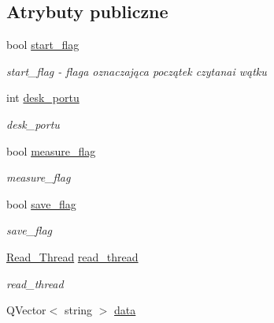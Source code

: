 \subsection*{Atrybuty publiczne}
\begin{DoxyCompactItemize}
\item 
bool \hyperlink{class_okno_a0cd2b4f8ec74806cc7d3256eff69385a}{start\+\_\+flag}\hypertarget{class_okno_a0cd2b4f8ec74806cc7d3256eff69385a}{}\label{class_okno_a0cd2b4f8ec74806cc7d3256eff69385a}

\begin{DoxyCompactList}\small\item\em start\+\_\+flag -\/ flaga oznaczająca początek czytanai wątku \end{DoxyCompactList}\item 
int \hyperlink{class_okno_ac9c31fbce4cb68413088827860277510}{desk\+\_\+portu}\hypertarget{class_okno_ac9c31fbce4cb68413088827860277510}{}\label{class_okno_ac9c31fbce4cb68413088827860277510}

\begin{DoxyCompactList}\small\item\em desk\+\_\+portu \end{DoxyCompactList}\item 
bool \hyperlink{class_okno_a5a94843afcfc67735c25e5a29f9cdc3c}{measure\+\_\+flag}\hypertarget{class_okno_a5a94843afcfc67735c25e5a29f9cdc3c}{}\label{class_okno_a5a94843afcfc67735c25e5a29f9cdc3c}

\begin{DoxyCompactList}\small\item\em measure\+\_\+flag \end{DoxyCompactList}\item 
bool \hyperlink{class_okno_afddfe7d21fc34910d75f92d8904acb23}{save\+\_\+flag}\hypertarget{class_okno_afddfe7d21fc34910d75f92d8904acb23}{}\label{class_okno_afddfe7d21fc34910d75f92d8904acb23}

\begin{DoxyCompactList}\small\item\em save\+\_\+flag \end{DoxyCompactList}\item 
\hyperlink{class_read___thread}{Read\+\_\+\+Thread} \hyperlink{class_okno_a6f836849c2547fcb51936a9c88c8e75a}{read\+\_\+thread}\hypertarget{class_okno_a6f836849c2547fcb51936a9c88c8e75a}{}\label{class_okno_a6f836849c2547fcb51936a9c88c8e75a}

\begin{DoxyCompactList}\small\item\em read\+\_\+thread \end{DoxyCompactList}\item 
Q\+Vector$<$ string $>$ \hyperlink{class_okno_af210b4fcf0872b832f3cc49bace1c48d}{data}\hypertarget{class_okno_af210b4fcf0872b832f3cc49bace1c48d}{}\label{class_okno_af210b4fcf0872b832f3cc49bace1c48d}


\end{DoxyCompactItemize}
